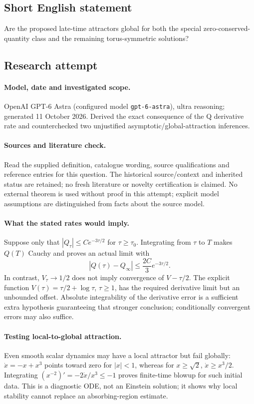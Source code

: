 \documentclass[11pt]{article}
\begin{document}
\subsection{Short English statement}
Are the proposed late-time attractors global for both the special zero-conserved-quantity class and the remaining torus-symmetric solutions?
\subsection{Research attempt}
\paragraph{Model, date and investigated scope.}
OpenAI GPT-6 Astra (configured model \texttt{gpt-6-astra}), ultra reasoning; generated 11 October 2026. Derived the exact consequence of the Q derivative rate and counterchecked two unjustified asymptotic/global-attraction inferences.

\paragraph{Sources and literature check.}
Read the supplied definition, catalogue wording, source qualifications and reference entries for this question. The historical source/context and inherited status are retained; no fresh literature or novelty certification is claimed. No external theorem is used without proof in this attempt; explicit model assumptions are distinguished from facts about the source model.

\paragraph{What the stated rates would imply.} Suppose only that \(|Q_\tau|\le Ce^{-3\tau/2}\) for \(\tau\ge\tau_0\). Integrating from \(\tau\) to \(T\) makes \(Q(T)\) Cauchy and proves an actual limit with
\[
 |Q(\tau)-Q_\infty|\le\frac{2C}{3}e^{-3\tau/2}.
\]
In contrast, \(V_\tau\to1/2\) does not imply convergence of \(V-\tau/2\). The explicit function \(V(\tau)=\tau/2+\log\tau\), \(\tau\ge1\), has the required derivative limit but an unbounded offset. Absolute integrability of the derivative error is a sufficient extra hypothesis guaranteeing that stronger conclusion; conditionally convergent errors may also suffice.
\paragraph{Testing local-to-global attraction.} Even smooth scalar dynamics may have a local attractor but fail globally: \(\dot x=-x+x^3\) points toward zero for \(|x|<1\), whereas for \(x\ge\sqrt2\), \(\dot x\ge x^3/2\). Integrating \((x^{-2})'=-2\dot x/x^3\le-1\) proves finite-time blowup for such initial data. This is a diagnostic ODE, not an Einstein solution; it shows why local stability cannot replace an absorbing-region estimate.
\end{document}
